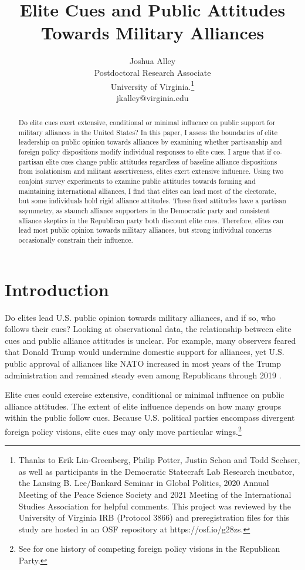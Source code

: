 \documentclass[12pt]{article}
\title{\textbf{Elite Cues and Public Attitudes Towards Military Alliances}}
\author{Joshua Alley \\
Postdoctoral Research Associate \\
University of Virginia.\thanks{Thanks to Erik Lin-Greenberg, Philip Potter, Justin Schon and Todd Sechser, as well as participants in the Democratic Statecraft Lab Research incubator, the Lansing B. Lee/Bankard Seminar in Global Politics, 2020 Annual Meeting of the Peace Science Society and 2021 Meeting of the International Studies Association for helpful comments. 
This project was reviewed by the University of Virginia IRB (Protocol 3866) and preregistration files for this study are hosted in an OSF repository at https://osf.io/g28zs.} \\
jkalley@virginia.edu
}
\date{}
\begin{document}
\maketitle 

\doublespace 

\begin{abstract}
Do elite cues exert extensive, conditional or minimal influence on public support for military alliances in the United States? 
In this paper, I assess the boundaries of elite leadership on public opinion towards alliances by examining whether partisanship and foreign policy dispositions modify individual responses to elite cues.
I argue that if co-partisan elite cues change public attitudes regardless of baseline alliance dispositions from isolationism and militant assertiveness, elites exert extensive influence. 
Using two conjoint survey experiments to examine public attitudes towards forming and maintaining international alliances, I find that elites can lead most of the electorate, but some individuals hold rigid alliance attitudes. 
These fixed attitudes have a partisan asymmetry, as staunch alliance supporters in the Democratic party and consistent alliance skeptics in the Republican party both discount elite cues.  
Therefore, elites can lead most public opinion towards military alliances, but strong individual concerns occasionally constrain their influence.  
\end{abstract}


\newpage 


\section{Introduction}


Do elites lead U.S. public opinion towards military alliances, and if so, who follows their cues?
Looking at observational data, the relationship between elite cues and public alliance attitudes is unclear.
For example, many observers feared that Donald Trump would undermine domestic support for alliances, yet U.S. public approval of alliances like NATO increased in most years of the Trump administration and remained steady even among Republicans through 2019 \citep{PewNATO2020}.


Elite cues could exercise extensive, conditional or minimal influence on public alliance attitudes.
The extent of elite influence depends on how many groups within the public follow cues. 
Because U.S. political parties encompass divergent foreign policy visions, elite cues may only move particular wings.\footnote{See \citet{Dueck2019} for one history of competing foreign policy visions in the Republican Party.}
\end{document}
